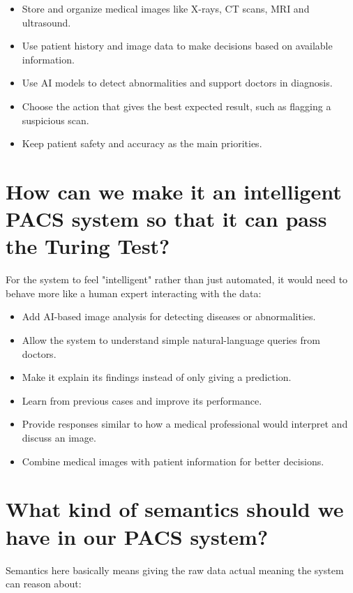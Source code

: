 \documentclass[11pt]{article}
\begin{document}
\begin{itemize}[noitemsep]
    \item Store and organize medical images like X-rays, CT scans, MRI and ultrasound.
    \item Use patient history and image data to make decisions based on available information.
    \item Use AI models to detect abnormalities and support doctors in diagnosis.
    \item Choose the action that gives the best expected result, such as flagging a suspicious scan.
    \item Keep patient safety and accuracy as the main priorities.
\end{itemize}

\section{How can we make it an intelligent PACS system so that it can pass the Turing Test?}

For the system to feel "intelligent" rather than just automated, it would need to behave more like a human expert interacting with the data:

\begin{itemize}[noitemsep]
    \item Add AI-based image analysis for detecting diseases or abnormalities.
    \item Allow the system to understand simple natural-language queries from doctors.
    \item Make it explain its findings instead of only giving a prediction.
    \item Learn from previous cases and improve its performance.
    \item Provide responses similar to how a medical professional would interpret and discuss an image.
    \item Combine medical images with patient information for better decisions.
\end{itemize}

\section{What kind of semantics should we have in our PACS system?}

Semantics here basically means giving the raw data actual meaning the system can reason about:
\end{document}
